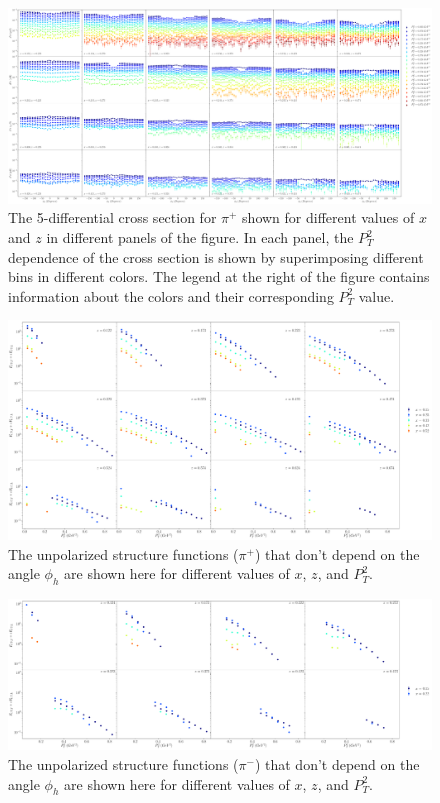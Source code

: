 \begin{figure}
  \centering
  \includegraphics[width=\textwidth]{image/plots/sidis/pip_cross_section_x_z.pdf}
  \caption[$d^5\sigma$ for $\pi^+$]{The 5-differential cross section for $\pi^+$ shown for different values of $x$ and $z$ in different panels of the figure.  In each panel, the $P_T^2$ dependence of the cross section is shown by superimposing different bins in different colors.  The legend at the right of the figure contains information about the colors and their corresponding $P_T^2$ value.}
    \label{fig:cross-section-pip}

\end{figure}


\begin{figure}
	\centering 
	\includegraphics[width = \textwidth]{image/plots/sidis/pip_f0_superimpose_x.pdf}
	\caption{The unpolarized structure functions ($\pi^+$) that don't depend on the angle $\phi_h$ are shown here for different values of $x$, $z$, and $P_T^2$.}
	\label{fig:pipf0x}	
\end{figure}

\begin{figure}
	\centering 
	\includegraphics[width = \textwidth]{image/plots/sidis/pim_f0_superimpose_x.pdf}
	\caption{The unpolarized structure functions ($\pi^-$) that don't depend on the angle $\phi_h$ are shown here for different values of $x$, $z$, and $P_T^2$.}
	\label{fig:pipf0x}	
\end{figure}

